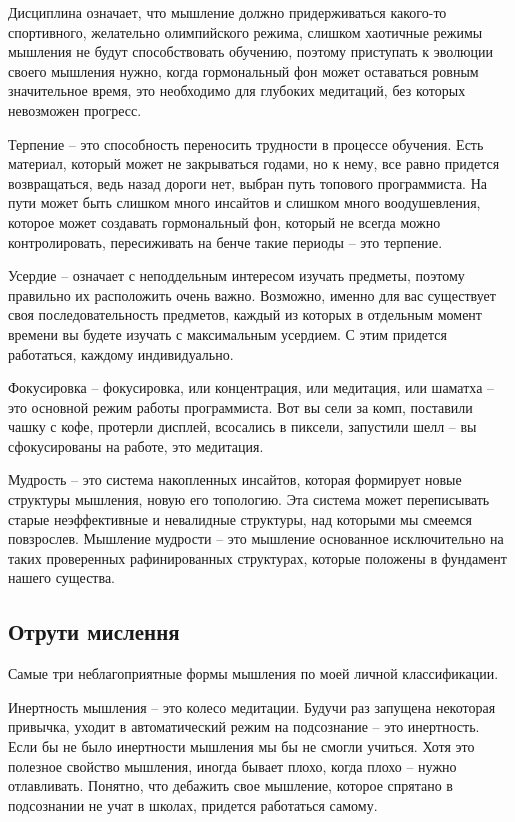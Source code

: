 Дисциплина означает, что мышление должно придерживаться какого-то спортивного, желательно олимпийского режима, слишком хаотичные режимы мышления не будут способствовать обучению, поэтому приступать к эволюции своего мышления нужно, когда гормональный фон может оставаться ровным значительное время, это необходимо для глубоких медитаций, без которых невозможен прогресс.

Терпение – это способность переносить трудности в процессе обучения. Есть материал, который может не закрываться годами, но к нему, все равно придется возвращаться, ведь назад дороги нет, выбран путь топового программиста. На пути может быть слишком много инсайтов и слишком много воодушевления, которое может создавать гормональный фон, который не всегда можно контролировать, пересиживать на бенче такие периоды – это терпение.

Усердие – означает с неподдельным интересом изучать предметы, поэтому правильно их расположить очень важно. Возможно, именно для вас существует своя последовательность предметов, каждый из которых в отдельным момент времени вы будете изучать с максимальным усердием. С этим придется работаться, каждому индивидуально.

Фокусировка – фокусировка, или концентрация, или медитация, или шаматха – это основной режим работы программиста. Вот вы сели за комп, поставили чашку с кофе, протерли дисплей, всосались в пиксели, запустили шелл – вы сфокусированы на работе, это медитация.

Мудрость – это система накопленных инсайтов, которая формирует новые структуры мышления, новую его топологию. Эта система может переписывать старые неэффективные и невалидные структуры, над которыми мы смеемся повзрослев. Мышление мудрости – это мышление основанное исключительно на таких проверенных рафинированных структурах, которые положены в фундамент нашего существа.

\subsection{Отрути мислення}

Самые три неблагоприятные формы мышления по моей личной классификации.

Инертность мышления – это колесо медитации. Будучи раз запущена некоторая привычка, уходит в автоматический режим на подсознание – это инертность. Если бы не было инертности мышления мы бы не смогли учиться. Хотя это полезное свойство мышления, иногда бывает плохо, когда плохо – нужно отлавливать. Понятно, что дебажить свое мышление, которое спрятано в подсознании не учат в школах, придется работаться самому.

